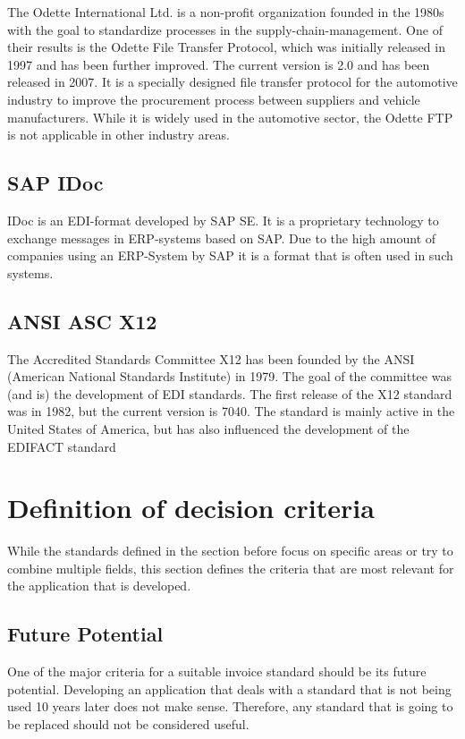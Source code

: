 The Odette International Ltd. is a non-profit organization founded in the 1980s with the goal to standardize processes in the supply-chain-management. One of their results is the Odette File Transfer Protocol, which was initially released in 1997 and has been further improved. The current version is 2.0 and has been released in 2007. It is a specially designed file transfer protocol for the automotive industry to improve the procurement process between suppliers and vehicle manufacturers. While it is widely used in the automotive sector, the Odette FTP is not applicable in other industry areas.

\subsection{SAP IDoc}
\label{sec2.1.6}

IDoc is an EDI-format developed by SAP SE. It is a proprietary technology to exchange messages in ERP-systems based on SAP. Due to the high amount of companies using an ERP-System by SAP it is a format that is often used in such systems.

\subsection{ANSI ASC X12}
\label{sec2.1.7}

The Accredited Standards Committee X12 has been founded by the ANSI (American National Standards Institute) in 1979. The goal of the committee was (and is) the development of EDI standards. The first release of the X12 standard was in 1982, but the current version is 7040. The standard is mainly active in the United States of America, but has also influenced the development of the EDIFACT standard

\section{Definition of decision criteria}
\label{sec2.2}

While the standards defined in the section before focus on specific areas or try to combine multiple fields, this section defines the criteria that are most relevant for the application that is developed.

\subsection{Future Potential}
\label{sec2.2.1}
One of the major criteria for a suitable invoice standard should be its future potential. Developing an application that deals with a standard that is not being used 10 years later does not make sense. Therefore, any standard that is going to be replaced should not be considered useful.


